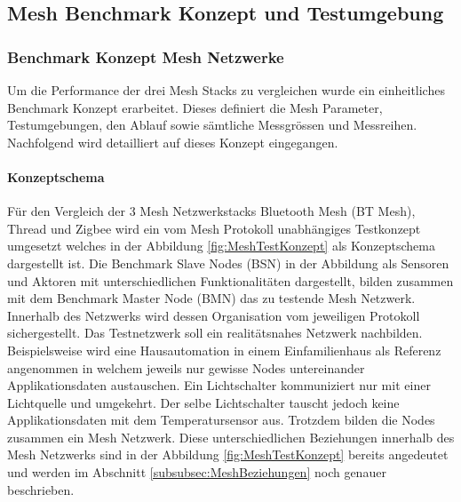 \vspace*{4cm}
\begin{center}
\part{Mesh Benchmark Konzept und Testumgebung}\label{MeshBenchmarkKonzeptundTestumgebung}
\end{center}
\vspace*{\fill}
\clearpage

\section{Benchmark Konzept Mesh Netzwerke}\label{sec:BenchmarkKonzeptMeshNetzwerke}

Um die Performance der drei Mesh Stacks zu vergleichen wurde ein einheitliches Benchmark Konzept erarbeitet. Dieses definiert die Mesh Parameter, Testumgebungen, den Ablauf sowie sämtliche Messgrössen und Messreihen. Nachfolgend wird detailliert auf dieses Konzept eingegangen.

\subsection{Konzeptschema}\label{subsec:KonzeptschemaMesh}

Für den Vergleich der 3 Mesh Netzwerkstacks Bluetooth Mesh (BT Mesh), Thread und Zigbee wird ein vom Mesh Protokoll unabhängiges Testkonzept umgesetzt welches in der Abbildung \ref{fig:MeshTestKonzept} als Konzeptschema dargestellt ist.
Die Benchmark Slave Nodes (BSN) in der Abbildung als Sensoren und Aktoren mit unterschiedlichen Funktionalitäten dargestellt, bilden zusammen mit dem Benchmark Master Node (BMN) das zu testende Mesh Netzwerk.
Innerhalb des Netzwerks wird dessen Organisation vom jeweiligen Protokoll sichergestellt.
Das Testnetzwerk soll ein realitätsnahes Netzwerk nachbilden.
Beispielsweise wird eine Hausautomation in einem Einfamilienhaus als Referenz angenommen in welchem jeweils nur gewisse Nodes untereinander Applikationsdaten austauschen.
Ein Lichtschalter kommuniziert nur mit einer Lichtquelle und umgekehrt.
Der selbe Lichtschalter tauscht jedoch keine Applikationsdaten mit dem Temperatursensor aus.
Trotzdem bilden die Nodes zusammen ein Mesh Netzwerk.
Diese unterschiedlichen Beziehungen innerhalb des Mesh Netzwerks sind in der Abbildung \ref{fig:MeshTestKonzept} bereits angedeutet und werden im Abschnitt \ref{subsubsec:MeshBeziehungen} noch genauer beschrieben.

